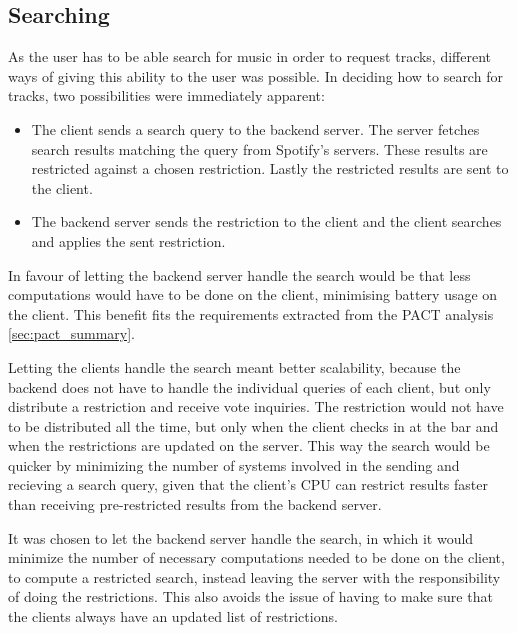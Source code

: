 \subsection{Searching}
As the user has to be able search for music in order to request tracks, different ways of giving this ability to the user was possible. In deciding how to search for tracks, two possibilities were immediately apparent:

\begin{itemize}
  \item The client sends a search query to the backend server. The
    server fetches search results matching the query from Spotify's servers. These results are restricted against a chosen restriction. Lastly the restricted results are sent to the client.
  \item The backend server sends the restriction to the client and the client searches and applies the sent restriction.
\end{itemize}

In favour of letting the backend server handle the search would be
that less computations would have to be done on the client, minimising
battery usage on the client. This benefit fits the requirements extracted from the PACT analysis \cref{sec:pact_summary}.

Letting the clients handle the search meant better scalability,
because the backend does not have to handle the individual queries of
each client, but only distribute a restriction and receive vote
inquiries. The restriction would not have to be distributed all the
time, but only  when the client checks in at the bar and when the
restrictions are updated on the server. This way the search would be
quicker by minimizing the number of systems involved in the sending and recieving a search query, given that
the client's CPU can restrict results faster than receiving pre-restricted results from the backend server.

It was chosen to let the backend server handle the search, in which it would minimize the number of necessary computations needed to be done on the client, to compute a restricted search, instead leaving the server with the responsibility of doing the restrictions. This also avoids the issue of having to make sure that the clients always have an updated list of restrictions.
